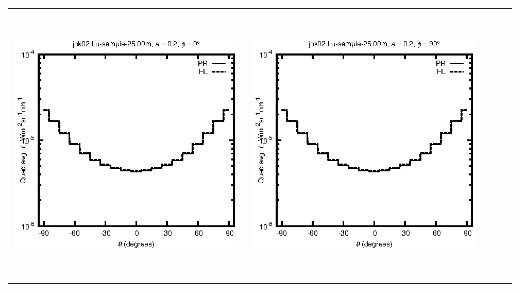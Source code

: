 \documentclass[10pt,a4paper]{article}
\begin{document}
\begin{adjustwidth}{-1.2in}{-1.2in}
\begin{tabular}{c c c c}
\includegraphics[height=7cm]{../eps/jok02_Lu_sample_25.00m_fwd.eps} &
\includegraphics[height=7cm]{../eps/jok02_Lu_sample_25.00m_cross.eps} \\
\end{tabular}

\pagebreak


\end{adjustwidth}
\end{document}
